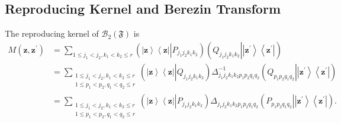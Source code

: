 \documentclass[aps,preprint]{revtex4}%
\begin{document}
\subsection{Reproducing Kernel and Berezin Transform}

The reproducing kernel of $\mathcal{B}_{2}\left(  \mathfrak{F}\right)  $ is
\begin{align}
M\left(  \mathbf{z,z}^{\prime}\right)   &  =\sum_{1\leq j_{1}<j_{2}%
,k_{1}<k_{2}\leq r}\left(  \left\vert \mathbf{z}\right\rangle \left\langle
\mathbf{z}\right\vert \left\vert P_{j_{1}j_{2}k_{1}k_{2}}\right.  \right)
\left(  \left.  Q_{j_{1}j_{2}k_{1}k_{2}}\right\vert \left\vert \mathbf{z}%
^{\prime}\right\rangle \left\langle \mathbf{z}^{\prime}\right\vert \right)
\nonumber\\
&  =\sum_{\substack{1\leq j_{1}<j_{2},k_{1}<k_{2}\leq r\\1\leq p_{1}%
<p_{2},q_{1}<q_{2}\leq r}}\left(  \left\vert \mathbf{z}\right\rangle
\left\langle \mathbf{z}\right\vert \left\vert Q_{j_{1}j_{2}k_{1}k_{2}}\right.
\right)  \Delta_{j_{1}j_{2}k_{1}k_{2}p_{1}p_{2}q_{1}q_{2}}^{-1}\left(  \left.
Q_{p_{1}p_{2}q_{1}q_{2}}\right\vert \left\vert \mathbf{z}^{\prime
}\right\rangle \left\langle \mathbf{z}^{\prime}\right\vert \right) \nonumber\\
&  =\sum_{\substack{1\leq j_{1}<j_{2},k_{1}<k_{2}\leq r\\1\leq p_{1}%
<p_{2},q_{1}<q_{2}\leq r}}\left(  \left\vert \mathbf{z}\right\rangle
\left\langle \mathbf{z}\right\vert \left\vert P_{j_{1}j_{2}k_{1}k_{2}}\right.
\right)  \Delta_{j_{1}j_{2}k_{1}k_{2}p_{1}p_{2}q_{1}q_{2}}\left(  \left.
P_{p_{1}p_{2}q_{1}q_{2}}\right\vert \left\vert \mathbf{z}^{\prime
}\right\rangle \left\langle \mathbf{z}^{\prime}\right\vert \right)  .
\end{align}
\end{document}
